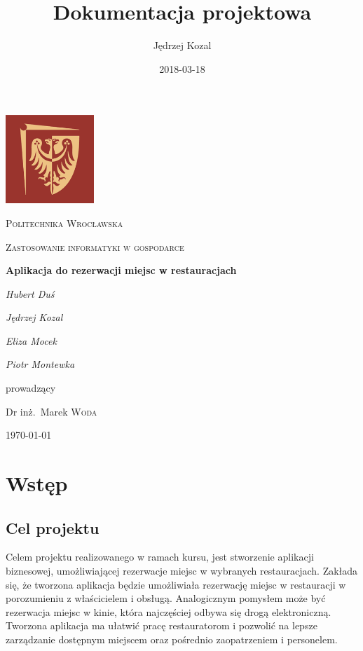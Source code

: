 \documentclass{article}
\title{Dokumentacja projektowa}
\date{2018-03-18}
\author{Jędrzej Kozal}
\begin{document}
\begin{titlepage}
	\centering
	\includegraphics[width=0.25\textwidth]{logo_pol_wroclaw.png}\par\vspace{1cm}
	{\scshape\LARGE Politechnika Wrocławska \par}
	\vspace{1cm}
	{\scshape\Large Zastosowanie informatyki w gospodarce\par}
	\vspace{1.5cm}
	{\huge\bfseries Aplikacja do rezerwacji miejsc w restauracjach \par}
	\vspace{2cm}
	{\Large\itshape Hubert Duś\par}
	{\Large\itshape Jędrzej Kozal\par}
	{\Large\itshape Eliza Mocek\par}
	{\Large\itshape Piotr Montewka\par}

	\vfill
	prowadzący\par
	Dr inż.~Marek \textsc{Woda}

	\vfill

	{\large \today\par}
\end{titlepage}


\section{Wstęp}

\subsection{Cel projektu}
Celem projektu realizowanego w ramach kursu, jest stworzenie aplikacji biznesowej, umożliwiającej rezerwacje miejsc w wybranych restauracjach. Zakłada się, że tworzona aplikacja będzie umożliwiała rezerwację miejsc w restauracji w porozumieniu z właścicielem i obsługą. Analogicznym pomysłem może być rezerwacja miejsc w kinie, która najczęściej odbywa się drogą elektroniczną. Tworzona aplikacja ma ułatwić pracę restauratorom i pozwolić na lepsze zarządzanie dostępnym miejscem oraz pośrednio zaopatrzeniem i personelem.
\end{document}

